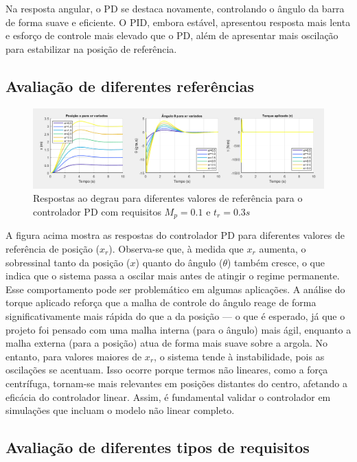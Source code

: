 \documentclass[a4paper, 12pt]{article} %
\begin{document}
Na resposta angular, o PD se destaca novamente, controlando o ângulo da barra de forma suave e eficiente. O PID, embora estável, apresentou resposta mais lenta e esforço de controle mais elevado que o PD, além de apresentar mais oscilação para estabilizar na posição de referência.

\subsection{Avaliação de diferentes referências}

\begin{figure}[H]
    \centering
    \includegraphics[width=1.0\textwidth]{images/teste_xr_PD_tr_3.0_Mp_0.1.png}
    \caption{\centering Respostas ao degrau para diferentes valores de referência para o controlador PD com requisitos $M_p=0.1$ e $t_r=0.3s$}
    \label{fig:resultado-controladores}
\end{figure}

A figura acima mostra as respostas do controlador PD para diferentes valores de referência de posição ($x_r$). Observa-se que, à medida que $x_r$ aumenta, o sobressinal tanto da posição ($x$) quanto do ângulo ($\theta$) também cresce, o que indica que o sistema passa a oscilar mais antes de atingir o regime permanente. Esse comportamento pode ser problemático em algumas aplicações. A análise do torque aplicado reforça que a malha de controle do ângulo reage de forma significativamente mais rápida do que a da posição — o que é esperado, já que o projeto foi pensado com uma malha interna (para o ângulo) mais ágil, enquanto a malha externa (para a posição) atua de forma mais suave sobre a argola. No entanto, para valores maiores de $x_r$, o sistema tende à instabilidade, pois as oscilações se acentuam. Isso ocorre porque termos não lineares, como a força centrífuga, tornam-se mais relevantes em posições distantes do centro, afetando a eficácia do controlador linear. Assim, é fundamental validar o controlador em simulações que incluam o modelo não linear completo.

\subsection{Avaliação de diferentes tipos de requisitos}
\end{document}
